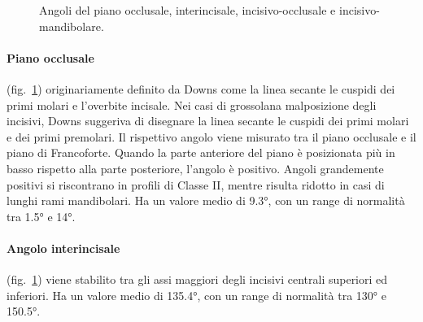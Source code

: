 \begin{figure}[h!]
 \centering
 \caption{Angoli del piano occlusale, interincisale, incisivo-occlusale e incisivo-mandibolare.}
 \label{fig:downs_angoli_incisali_occlusale}
\end{figure}

\paragraph{Piano occlusale} (fig.~\ref{fig:downs_angoli_incisali_occlusale}) originariamente definito da Downs come la linea secante le cuspidi dei primi molari e l'overbite incisale. Nei casi di grossolana malposizione degli incisivi, Downs suggeriva di disegnare la linea secante le cuspidi dei primi molari e dei primi premolari. Il rispettivo angolo viene misurato tra il piano occlusale e il piano di Francoforte. Quando la parte anteriore del piano è posizionata più in basso rispetto alla parte posteriore, l'angolo è positivo. Angoli grandemente positivi si riscontrano in profili di Classe II, mentre risulta ridotto in casi di lunghi rami mandibolari. Ha un valore medio di 9.3°, con un range di normalità tra 1.5° e 14°.

\paragraph{Angolo interincisale} (fig.~\ref{fig:downs_angoli_incisali_occlusale}) viene stabilito tra gli assi maggiori degli incisivi centrali superiori ed inferiori. Ha un valore medio di 135.4°, con un range di normalità tra 130° e 150.5°.

